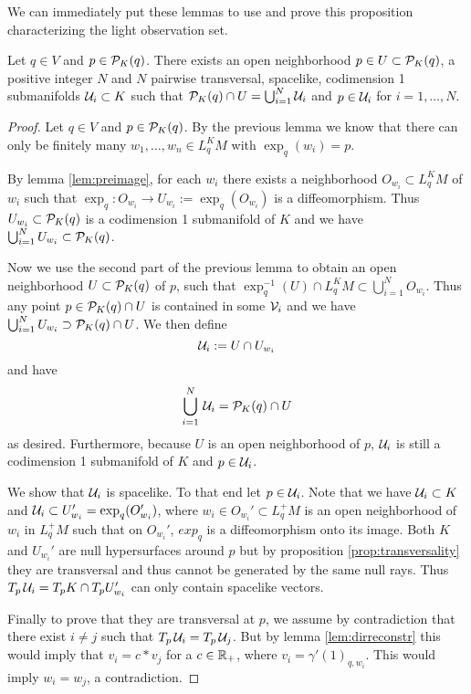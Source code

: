 We can immediately put these lemmas to use and prove this proposition characterizing the light observation set.
\begin{proposition}\label{prop:unionmanif}
Let $q\in V$ and $p\in \mathcal{P}_K(q)$. There exists an open neighborhood $p\in U\subset \mathcal{P}_K(q)$, a positive integer $N$ and $N$ pairwise transversal, spacelike, codimension 1 submanifolds $\mathcal{U}_i\subset K$ such that $\mathcal{P}_K(q) \cap U = \bigcup_{i=1}^N \mathcal{U}_i$ and $p\in \mathcal{U}_i$ for $i={1,\dots, N}$.
\end{proposition}
\begin{proof}
    Let $q\in V$ and $p\in \mathcal{P}_K(q)$. By the previous lemma we know that there can only be finitely many $w_1,\dots,w_n\in L^K_qM$ with $\exp_q(w_i)=p$. 

    By lemma \ref{lem:preimage}, for each $w_i$ there exists a neighborhood $O_{w_i}\subset L^K_qM$ of $w_i$ such that $\exp_q:O_{w_i}\to U_{w_i}:=\exp_q(O_{w_i})$ is a diffeomorphism. Thus $U_{w_i}\subset \mathcal{P}_K(q)$ is a codimension 1 submanifold of $K$ and we have $\bigcup_{i=1}^N U_{w_i}\subset \mathcal{P}_K(q)$.

    Now we use the second part of the previous lemma to obtain an open neighborhood $U\subset \mathcal{P}_K(q)$ of $p$, such that $\exp_q^{-1}(U)\cap L^K_qM\subset \bigcup_{i=1}^N O_{w_i}$. Thus any point $p\in \mathcal{P}_K(q) \cap U$ is contained in some $\mathcal{V}_i$ and we have $\bigcup_{i=1}^N U_{w_i} \supset \mathcal{P}_K(q)\cap U$. 
    We then define 
    \[
        \mathcal{U}_i := U \cap U_{w_i}
    \] and have 
    \[
        \bigcup_{i=1}^N \,\mathcal{U}_i = \mathcal{P}_K(q)\cap U
    \] as desired. Furthermore, because $U$ is an open neighborhood of $p$, $\mathcal{U}_i$ is still a codimension 1 submanifold of $K$ and $p\in \mathcal{U}_i$.

    We show that $\mathcal{U}_i$ is spacelike. To that end let $p\in \mathcal{U}_i$. Note that we have $\mathcal{U}_i\subset K$ and $\mathcal{U}_i\subset U_{w_i}' = \exp_q(O_{w_i}')$, where $w_i\in O_{w_i}' \subset L^+_qM$ is an open neighborhood of $w_i$ in $L^+_qM$ such that on $O_{w_i}'$, $exp_q$ is a diffeomorphism onto its image. Both $K$ and $U_{w_i}'$ are null hypersurfaces around $p$ but by proposition \ref{prop:transversality} they are transversal and thus cannot be generated by the same null rays. Thus $T_p\,\mathcal{U}_i = T_pK \cap T_pU_{w_i}'$ can only contain spacelike vectors.

    Finally to prove that they are transversal at $p$, we assume by contradiction that there exist $i\neq j$ such that $T_p\,\mathcal{U}_i=T_p\,\mathcal{U}_j$. But by lemma \ref{lem:dirreconstr} this would imply that $v_i = c*v_j$ for a $c\in \mathbb{R}_+$, where $v_i = \gamma'(1)_{q,w_i}$. This would imply $w_i = w_j$, a contradiction.
\end{proof}

